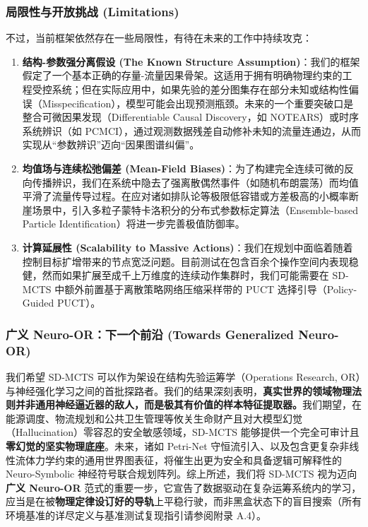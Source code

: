\documentclass[UTF8]{ctexart}
\begin{document}
\hypertarget{ux5c40ux9650ux6027ux4e0eux5f00ux653eux6311ux6218-limitations}{%
\subsubsection{局限性与开放挑战
(Limitations)}\label{ux5c40ux9650ux6027ux4e0eux5f00ux653eux6311ux6218-limitations}}

不过，当前框架依然存在一些局限性，有待在未来的工作中持续攻克：

\begin{enumerate}
\item \textbf{结构-参数强分离假设 (The Known Structure Assumption)}：我们的框架假定了一个基本正确的存量-流量因果骨架。这适用于拥有明确物理约束的工程受控系统；但在实际应用中，如果先验的差分图集存在部分未知或结构性偏误（Misspecification），模型可能会出现预测瓶颈。未来的一个重要突破口是整合可微因果发现（Differentiable Causal Discovery，如 NOTEARS）或时序系统辨识（如 PCMCI），通过观测数据残差自动修补未知的流量连通边，从而实现从“参数辨识”迈向“因果图谱纠偏”。
\item \textbf{均值场与连续松弛偏差 (Mean-Field Biases)}：为了构建完全连续可微的反向传播辨识，我们在系统中隐去了强离散偶然事件（如随机布朗震荡）而均值平滑了流量传导过程。在应对诸如排队论等极限低容错或方差极高的小概率断崖场景中，引入多粒子蒙特卡洛积分的分布式参数标定算法（Ensemble-based Particle Identification）将进一步完善极值防御率。
\item \textbf{计算延展性 (Scalability to Massive Actions)}：我们在规划中面临着随着控制目标扩增带来的节点宽泛问题。目前测试在包含百余个操作空间内表现稳健，然而如果扩展至成千上万维度的连续动作集群时，我们可能需要在 SD-MCTS 中额外前置基于离散策略网络压缩采样带的 PUCT 选择引导（Policy-Guided PUCT）。
\end{enumerate}

\hypertarget{ux5e7fux4e49-neuro-orux4e0bux4e00ux4e2aux524dux6cbf-towards-generalized-neuro-or}{%
\subsubsection{广义 Neuro-OR：下一个前沿 (Towards Generalized
Neuro-OR)}\label{ux5e7fux4e49-neuro-orux4e0bux4e00ux4e2aux524dux6cbf-towards-generalized-neuro-or}}

我们希望 SD-MCTS 可以作为架设在结构先验运筹学（Operations Research,
OR）与神经强化学习之间的首批探路者。我们的结果深刻表明，\textbf{真实世界的领域物理法则并非通用神经逼近器的敌人，而是极其有价值的样本特征提取器。}我们期望，在能源调度、物流规划和公共卫生管理等攸关生命财产且对大模型幻觉（Hallucination）零容忍的安全敏感领域，SD-MCTS 能够提供一个完全可审计且\textbf{零幻觉的坚实物理底座}。未来，诸如
Petri-Net
守恒流引入、以及包含更复杂非线性流体力学约束的通用世界图表征，将催生出更为安全和具备逻辑可解释性的
Neuro-Symbolic
神经符号联合规划阵列。综上所述，我们将 SD-MCTS 视为迈向\textbf{广义 Neuro-OR} 范式的重要一步，它宣告了数据驱动在复杂运筹系统内的学习，应当是在被\textbf{物理定律设订好的导轨}上平稳行驶，而非黑盒状态下的盲目搜索（所有环境基准的详尽定义与基准测试复现指引请参阅附录
A.4）。
\end{document}
